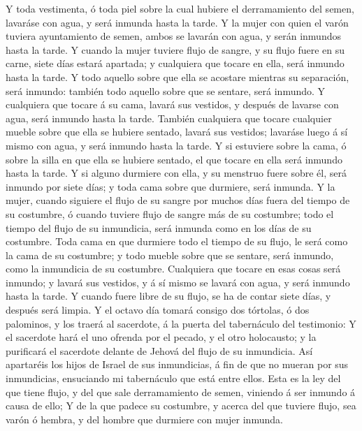  Y toda vestimenta, ó toda piel sobre la cual hubiere el
derramamiento del semen, lavaráse con agua, y será inmunda hasta la
tarde.  Y la mujer con quien el varón tuviera
ayuntamiento de semen, ambos se lavarán con agua, y serán inmundos hasta
la tarde.  Y cuando la mujer tuviere flujo de sangre, y
su flujo fuere en su carne, siete días estará apartada; y cualquiera que
tocare en ella, será inmundo hasta la tarde.  Y todo
aquello sobre que ella se acostare mientras su separación, será inmundo:
también todo aquello sobre que se sentare, será inmundo. 
Y cualquiera que tocare á su cama, lavará sus vestidos, y después de
lavarse con agua, será inmundo hasta la tarde.  También
cualquiera que tocare cualquier mueble sobre que ella se hubiere
sentado, lavará sus vestidos; lavaráse luego á sí mismo con agua, y será
inmundo hasta la tarde.  Y si estuviere sobre la cama, ó
sobre la silla en que ella se hubiere sentado, el que tocare en ella
será inmundo hasta la tarde.  Y si alguno durmiere con
ella, y su menstruo fuere sobre él, será inmundo por siete días; y toda
cama sobre que durmiere, será inmunda.  Y la mujer,
cuando siguiere el flujo de su sangre por muchos días fuera del tiempo
de su costumbre, ó cuando tuviere flujo de sangre más de su costumbre;
todo el tiempo del flujo de su inmundicia, será inmunda como en los días
de su costumbre.  Toda cama en que durmiere todo el
tiempo de su flujo, le será como la cama de su costumbre; y todo mueble
sobre que se sentare, será inmundo, como la inmundicia de su costumbre.
 Cualquiera que tocare en esas cosas será inmundo; y
lavará sus vestidos, y á sí mismo se lavará con agua, y será inmundo
hasta la tarde.  Y cuando fuere libre de su flujo, se ha
de contar siete días, y después será limpia.  Y el octavo
día tomará consigo dos tórtolas, ó dos palominos, y los traerá al
sacerdote, á la puerta del tabernáculo del testimonio:  Y
el sacerdote hará el uno ofrenda por el pecado, y el otro holocausto; y
la purificará el sacerdote delante de Jehová del flujo de su inmundicia.
 Así apartaréis los hijos de Israel de sus inmundicias, á
fin de que no mueran por sus inmundicias, ensuciando mi tabernáculo que
está entre ellos.  Esta es la ley del que tiene flujo, y
del que sale derramamiento de semen, viniendo á ser inmundo á causa de
ello;  Y de la que padece su costumbre, y acerca del que
tuviere flujo, sea varón ó hembra, y del hombre que durmiere con mujer
inmunda.

